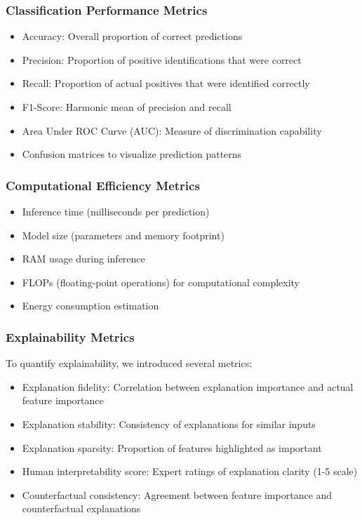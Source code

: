 \documentclass[conference,compsoc]{IEEEtran}
\begin{document}
\subsubsection{Classification Performance Metrics}
\begin{itemize}
    \item Accuracy: Overall proportion of correct predictions
    \item Precision: Proportion of positive identifications that were correct
    \item Recall: Proportion of actual positives that were identified correctly
    \item F1-Score: Harmonic mean of precision and recall
    \item Area Under ROC Curve (AUC): Measure of discrimination capability
    \item Confusion matrices to visualize prediction patterns
\end{itemize}

\subsubsection{Computational Efficiency Metrics}
\begin{itemize}
    \item Inference time (milliseconds per prediction)
    \item Model size (parameters and memory footprint)
    \item RAM usage during inference
    \item FLOPs (floating-point operations) for computational complexity
    \item Energy consumption estimation
\end{itemize}

\subsubsection{Explainability Metrics}
To quantify explainability, we introduced several metrics:
\begin{itemize}
    \item Explanation fidelity: Correlation between explanation importance and actual feature importance
    \item Explanation stability: Consistency of explanations for similar inputs
    \item Explanation sparsity: Proportion of features highlighted as important
    \item Human interpretability score: Expert ratings of explanation clarity (1-5 scale)
    \item Counterfactual consistency: Agreement between feature importance and counterfactual explanations
\end{itemize}
\end{document}
